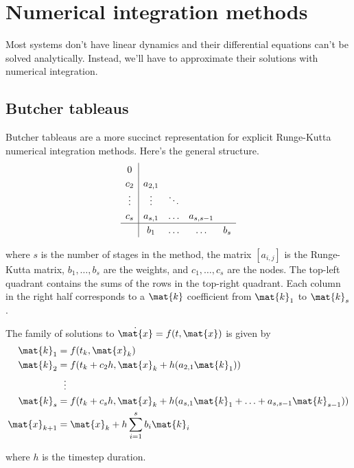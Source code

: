 \section{Numerical integration methods}

Most systems don't have linear dynamics and their differential equations can't
be solved analytically. Instead, we'll have to approximate their solutions with
numerical integration.

\subsection{Butcher tableaus}

Butcher tableaus are a more succinct representation for explicit Runge-Kutta
numerical integration methods. Here's the general structure.
\begin{equation*}
  \renewcommand\arraystretch{1.2}
  \begin{array}{c|cccc}
    0 \\
    c_2    & a_{2,1} \\
    \vdots & \vdots & \ddots \\
    c_s    & a_{s,1} & \hdots & a_{s,s-1} \\
    \hline
           & b_1    & \hdots & \hdots    & b_s
  \end{array}
\end{equation*}

where $s$ is the number of stages in the method, the matrix $[a_{i,j}]$ is the
Runge-Kutta matrix, $b_1, \ldots, b_s$ are the weights, and $c_1, \ldots, c_s$
are the nodes. The top-left quadrant contains the sums of the rows in the
top-right quadrant. Each column in the right half corresponds to a $\mat{k}$
coefficient from $\mat{k}_1$ to $\mat{k}_s$.

The family of solutions to $\dot{\mat{x}} = f(t, \mat{x})$ is given by
\begin{align*}
  \mat{k}_1 &= f(t_k, \mat{x}_k) \\
  \mat{k}_2 &= f(t_k + c_2 h, \mat{x}_k + h (a_{2,1} \mat{k}_1)) \\
  &\ \ \vdots \\
  \mat{k}_s &= f(t_k + c_s h, \mat{x}_k +
    h (a_{s,1} \mat{k}_1 + \ldots + a_{s,s-1} \mat{k}_{s-1})) \\
  \mat{x}_{k+1} &= \mat{x}_k + h \sum_{i=1}^s b_i \mat{k}_i
\end{align*}

where $h$ is the timestep duration.

